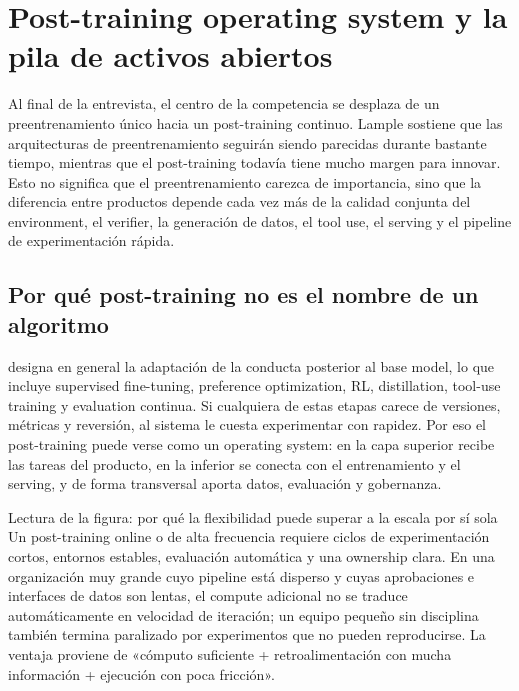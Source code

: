 \section{Post-training operating system y la pila de activos abiertos}

Al final de la entrevista, el centro de la competencia se desplaza de un preentrenamiento único hacia un post-training continuo. Lample sostiene que las arquitecturas de preentrenamiento seguirán siendo parecidas durante bastante tiempo, mientras que el post-training todavía tiene mucho margen para innovar. Esto no significa que el preentrenamiento carezca de importancia, sino que la diferencia entre productos depende cada vez más de la calidad conjunta del environment, el verifier, la generación de datos, el tool use, el serving y el pipeline de experimentación rápida.

\subsection{Por qué post-training no es el nombre de un algoritmo}

 designa en general la adaptación de la conducta posterior al base model, lo que incluye supervised fine-tuning, preference optimization, RL, distillation, tool-use training y evaluation continua. Si cualquiera de estas etapas carece de versiones, métricas y reversión, al sistema le cuesta experimentar con rapidez. Por eso el post-training puede verse como un operating system: en la capa superior recibe las tareas del producto, en la inferior se conecta con el entrenamiento y el serving, y de forma transversal aporta datos, evaluación y gobernanza.


\begin{knowledgebox}{Lectura de la figura: por qué la flexibilidad puede superar a la escala por sí sola}
Un post-training online o de alta frecuencia requiere ciclos de experimentación cortos, entornos estables, evaluación automática y una ownership clara. En una organización muy grande cuyo pipeline está disperso y cuyas aprobaciones e interfaces de datos son lentas, el compute adicional no se traduce automáticamente en velocidad de iteración; un equipo pequeño sin disciplina también termina paralizado por experimentos que no pueden reproducirse. La ventaja proviene de «cómputo suficiente + retroalimentación con mucha información + ejecución con poca fricción».
\end{knowledgebox}

